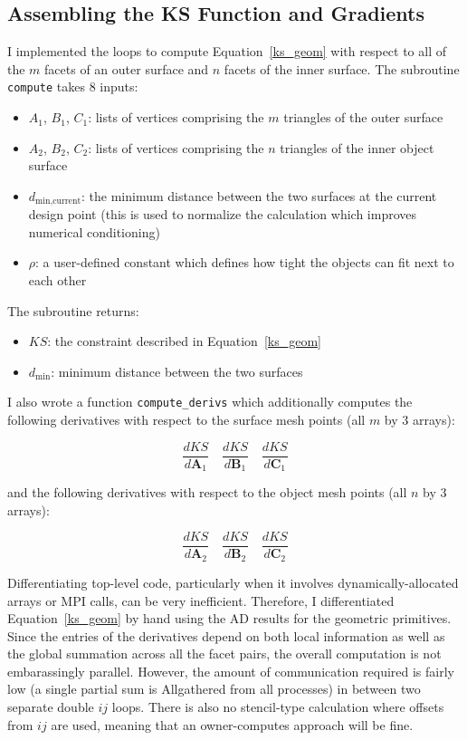 \documentclass[11pt,letterpaper]{article}
\begin{document}
\subsection{Assembling the KS Function and Gradients}
\qquad I implemented the loops to compute Equation~\ref{ks_geom} with respect to all of the $m$ facets of an outer surface and $n$ facets of the inner surface.
The subroutine \texttt{compute} takes 8 inputs:

\begin{itemize}
  \item $A_1$, $B_1$, $C_1$: lists of vertices comprising the $m$ triangles of the outer surface
  \item $A_2$, $B_2$, $C_2$: lists of vertices comprising the $n$ triangles of the inner object surface
  \item $d_\text{min,current}$: the minimum distance between the two surfaces at the current design point (this is used to normalize the calculation which improves numerical conditioning)
  \item $\rho$: a user-defined constant which defines how tight the objects can fit next to each other 
\end{itemize}

The subroutine returns:

\begin{itemize}
  \item $KS$: the constraint described in Equation~\ref{ks_geom}
  \item $d_\text{min}$: minimum distance between the two surfaces
\end{itemize}

I also wrote a function \texttt{compute\_derivs} which additionally computes the following derivatives with respect to the surface mesh points (all $m$ by 3 arrays):

\begin{equation}
  \frac{dKS}{d\textbf{A}_1} \, \, \, \, \, \, \frac{dKS}{d\textbf{B}_1} \, \, \, \, \, \, \frac{dKS}{d\textbf{C}_1} 
\end{equation}

and the following derivatives with respect to the object mesh points (all $n$ by 3 arrays):

\begin{equation}
  \frac{dKS}{d\textbf{A}_2} \, \, \, \, \, \, \frac{dKS}{d\textbf{B}_2} \, \, \, \, \, \, \frac{dKS}{d\textbf{C}_2} 
\end{equation}

Differentiating top-level code, particularly when it involves dynamically-allocated arrays or MPI calls, can be very inefficient.
Therefore, I differentiated Equation~\ref{ks_geom} by hand using the AD results for the geometric primitives.
Since the entries of the derivatives depend on both local information as well as the global summation across all the facet pairs, the overall computation is not embarassingly parallel.
However, the amount of communication required is fairly low (a single partial sum is Allgathered from all processes) in between two separate double $ij$ loops.
There is also no stencil-type calculation where offsets from $ij$ are used, meaning that an owner-computes approach will be fine.
\end{document}
